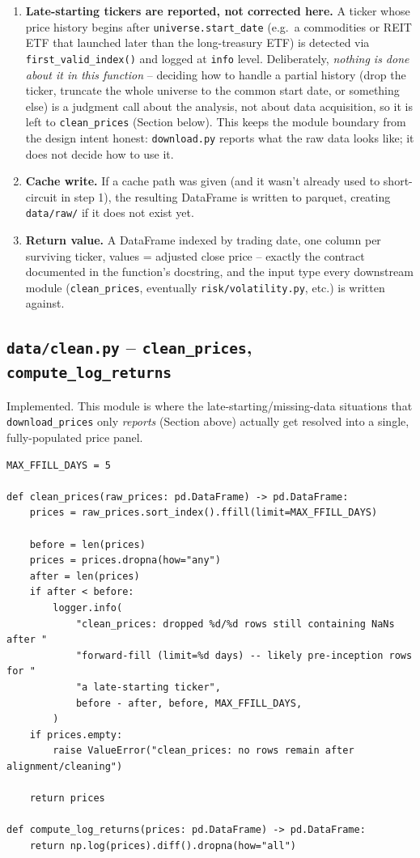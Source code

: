\documentclass[11pt]{article}
\begin{document}
\begin{enumerate}
    \item \textbf{Late-starting tickers are reported, not corrected
    here.} A ticker whose price history begins after
    \texttt{universe.start\_date} (e.g.\ a commodities or REIT ETF that
    launched later than the long-treasury ETF) is detected via
    \texttt{first\_valid\_index()} and logged at \texttt{info} level.
    Deliberately, \emph{nothing is done about it in this function} --
    deciding how to handle a partial history (drop the ticker, truncate
    the whole universe to the common start date, or something else) is a
    judgment call about the analysis, not about data acquisition, so
    it is left to \texttt{clean\_prices} (Section below). This keeps the
    module boundary from the design intent honest: \texttt{download.py}
    reports what the raw data looks like; it does not decide how to use
    it.

    \item \textbf{Cache write.} If a cache path was given (and it wasn't
    already used to short-circuit in step 1), the resulting DataFrame is
    written to parquet, creating \texttt{data/raw/} if it does not exist
    yet.

    \item \textbf{Return value.} A DataFrame indexed by trading date,
    one column per surviving ticker, values = adjusted close price --
    exactly the contract documented in the function's docstring, and the
    input type every downstream module (\texttt{clean\_prices},
    eventually \texttt{risk/volatility.py}, etc.) is written against.
\end{enumerate}

\subsection{\texttt{data/clean.py} -- \texttt{clean\_prices}, \texttt{compute\_log\_returns}}

Implemented. This module is where the late-starting/missing-data
situations that \texttt{download\_prices} only \emph{reports}
(Section above) actually get resolved into a single, fully-populated
price panel.

\begin{lstlisting}
MAX_FFILL_DAYS = 5

def clean_prices(raw_prices: pd.DataFrame) -> pd.DataFrame:
    prices = raw_prices.sort_index().ffill(limit=MAX_FFILL_DAYS)

    before = len(prices)
    prices = prices.dropna(how="any")
    after = len(prices)
    if after < before:
        logger.info(
            "clean_prices: dropped %d/%d rows still containing NaNs after "
            "forward-fill (limit=%d days) -- likely pre-inception rows for "
            "a late-starting ticker",
            before - after, before, MAX_FFILL_DAYS,
        )
    if prices.empty:
        raise ValueError("clean_prices: no rows remain after alignment/cleaning")

    return prices

def compute_log_returns(prices: pd.DataFrame) -> pd.DataFrame:
    return np.log(prices).diff().dropna(how="all")
\end{lstlisting}
\end{document}
